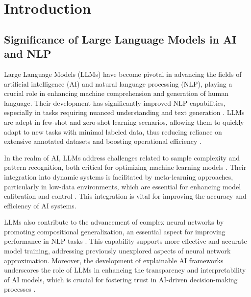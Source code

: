 \section{Introduction} \label{sec:Introduction}


\subsection{Significance of Large Language Models in AI and NLP} \label{subsec:Significance of Large Language Models in AI and NLP}



Large Language Models (LLMs) have become pivotal in advancing the fields of artificial intelligence (AI) and natural language processing (NLP), playing a crucial role in enhancing machine comprehension and generation of human language. Their development has significantly improved NLP capabilities, especially in tasks requiring nuanced understanding and text generation \cite{touvron2023llama}. LLMs are adept in few-shot and zero-shot learning scenarios, allowing them to quickly adapt to new tasks with minimal labeled data, thus reducing reliance on extensive annotated datasets and boosting operational efficiency \cite{alayrac2022flamingo}.



In the realm of AI, LLMs address challenges related to sample complexity and pattern recognition, both critical for optimizing machine learning models \cite{ryabko2005samplecomplexitycomputationalpattern}. Their integration into dynamic systems is facilitated by meta-learning approaches, particularly in low-data environments, which are essential for enhancing model calibration and control \cite{busetto2023metalearningmodelreferencedatadrivencontrol}. This integration is vital for improving the accuracy and efficiency of AI systems.



LLMs also contribute to the advancement of complex neural networks by promoting compositional generalization, an essential aspect for improving performance in NLP tasks \cite{zheng2023layerwiserepresentationfusioncompositional}. This capability supports more effective and accurate model training, addressing previously unexplored aspects of neural network approximation. Moreover, the development of explainable AI frameworks underscores the role of LLMs in enhancing the transparency and interpretability of AI models, which is crucial for fostering trust in AI-driven decision-making processes \cite{chiaburu2024copronnconceptbasedprototypicalnearest}.



